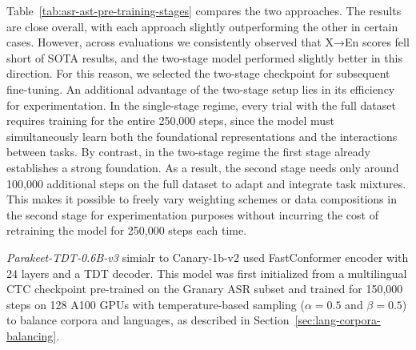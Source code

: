 Table~\ref{tab:asr-ast-pre-training-stages} compares the two approaches. The results are close overall, with each approach slightly outperforming the other in certain cases. However, across evaluations we consistently observed that X→En scores fell short of SOTA results, and the two-stage model performed slightly better in this direction. For this reason, we selected the two-stage checkpoint for subsequent fine-tuning. An additional advantage of the two-stage setup lies in its efficiency for experimentation. In the single-stage regime, every trial with the full dataset requires training for the entire 250,000 steps, since the model must simultaneously learn both the foundational representations and the interactions between tasks. By contrast, in the two-stage regime the first stage already establishes a strong foundation. As a result, the second stage needs only around 100,000 additional steps on the full dataset to adapt and integrate task mixtures. This makes it possible to freely vary weighting schemes or data compositions in the second stage for experimentation purposes without incurring the cost of retraining the model for 250,000 steps each time.



\emph{Parakeet-TDT-0.6B-v3} simialr to Canary-1b-v2 used FastConformer encoder with 24 layers and a TDT decoder\cite{xu2023efficient}. This model was first initialized from a multilingual CTC checkpoint pre-trained on the Granary ASR subset and trained for 150,000 steps on 128 A100 GPUs with temperature-based sampling ($\alpha = 0.5$ and $\beta = 0.5$) to balance corpora and languages, as described in Section~\ref{sec:lang-corpora-balancing}.




